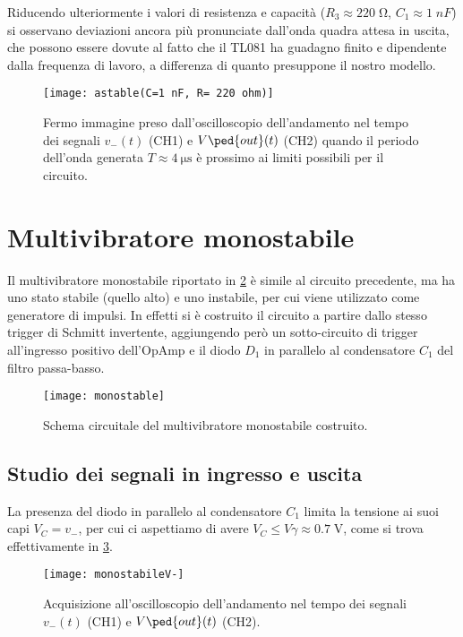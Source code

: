 \documentclass[10pt, a4paper, italian]{article}
\begin{document}
Riducendo ulteriormente i valori di resistenza e capacità
($R_3 \approx 220 \; \si{\ohm}$, $C_1 \approx 1 \; \si{nF}$) si osservano
deviazioni ancora più pronunciate dall'onda quadra attesa in uscita, che
possono essere dovute al fatto che il TL081 ha guadagno finito e dipendente
dalla frequenza di lavoro, a differenza di quanto presuppone il nostro modello. 
\begin{figure}[htbp]
	\centering
	\texttt{[image: astable(C=1 nF, R= 220 ohm)]}
	\caption{Fermo immagine preso dall'oscilloscopio dell'andamento nel tempo dei
	segnali $v_- (t)$ (CH1) e $V\ped{out} (t)$ (CH2) quando il periodo dell'onda
	generata $T \approx \SI{4}{\micro\s}$ è prossimo ai limiti possibili per il
	circuito. \label{fig: astable_lim}}
\end{figure}

\section{Multivibratore monostabile}
Il multivibratore monostabile riportato in \cref{fig: mstableschm} è simile
al circuito precedente, ma ha uno stato stabile (quello alto) e uno instabile,
per cui viene utilizzato come generatore di impulsi. In effetti si è costruito
il circuito a partire dallo stesso trigger di Schmitt invertente, aggiungendo
però un sotto-circuito di trigger all'ingresso positivo dell'OpAmp e il diodo
$D_1$ in parallelo al condensatore $C_1$ del filtro passa-basso.
\begin{figure}[htbp]
    \centering
	\texttt{[image: monostable]}
    \caption{Schema circuitale del multivibratore monostabile costruito.
    \label{fig: mstableschm}}
\end{figure}

\subsection{Studio dei segnali in ingresso e uscita}
La presenza del diodo in parallelo al condensatore $C_1$ limita la tensione
ai suoi capi $V_C = v_-$, per cui ci aspettiamo di avere
$V_C \leq V\gamma \approx 0.7 \; \si{\V}$, come si trova effettivamente in
\cref{fig: mstabilev-}.
\begin{figure}[htbp]
	\centering
	\texttt{[image: monostabileV-]}
	\caption{Acquisizione all'oscilloscopio dell'andamento nel tempo dei
	segnali $v_- (t)$ (CH1) e $V\ped{out} (t)$ (CH2). \label{fig: mstabilev-}}
\end{figure}
\end{document}
